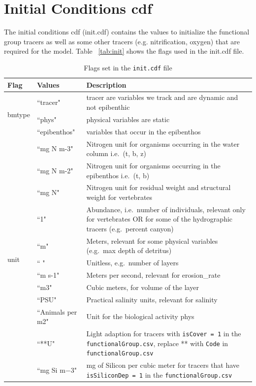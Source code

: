\documentclass{report}
\begin{document}
\section{Initial Conditions cdf}

The initial conditions cdf (init.cdf) contains the values to initialize the functional group tracers as well as some other tracers (e.g. nitrification, oxygen) that are required for the model. Table ~\ref{tab:init} shows the flags used in the init.cdf file.

\begin{center}
\begin{longtable}{llp{8cm}}
\caption{Flags set in the \texttt{init.cdf} file} \\
\hline
Flag & Values & Description \\
\hline
\multirow{3}{*}{bmtype} & ``tracer"  & tracer are variables we track and are dynamic and not epibenthic \\ 
&  ``phys" &  physical variables are static \\
& ``epibenthos" & variables that occur in the epibenthos \\
\hline
\multirow{20}{*}{unit} & ``mg N m-3" & Nitrogen unit for organisms occurring in the water column i.e.\ (t, b, z) \\
&``mg N m-2" & Nitrogen unit for organisms occurring in the epibenthos i.e.\ (t, b) \\
&``mg N" & Nitrogen unit for residual weight and structural weight for vertebrates \\
&``1" & Abundance, i.e.\ number of individuals, relevant only for vertebrates OR for some of the hydrographic tracers (e.g.\ percent canyon) \\
&``m" & Meters, relevant for some physical variables (e.g.\ max depth of detritus) \\
&`` " & Unitless, e.g.\ number of layers \\
&``m s-1" & Meters per second, relevant for erosion\_rate \\
&``m3" & Cubic meters, for volume of the layer \\
&``PSU" & Practical salinity units, relevant for salinity \\
&``Animals per m2" & Unit for the biological activity phys \\
&``**U" & Light adaption for tracers with \texttt{isCover = 1} in the \texttt{functionalGroup.csv}, replace ** with \texttt{Code} in \texttt{functionalGroup.csv}  \\
&``mg Si m$-$3" & mg of Silicon per cubic meter for tracers that have \texttt{isSiliconDep = 1} in the \texttt{functionalGroup.csv} \\

\end{longtable}
\end{center}
\end{document}
